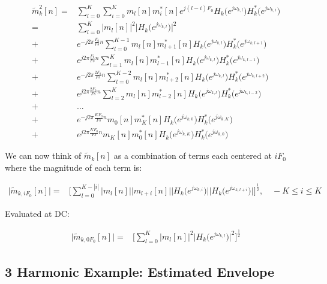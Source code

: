 \documentclass [11pt, proquest] {uwthesis}[2015/03/03]
\begin{document}
\begin{align}
\tilde{m}_k^2[n] =& \sum\limits_{l=0}^K \sum\limits_{i=0}^K m_l[n] m_i^*[n] e^{j(l-i)F_0} H_k\big(e^{j\omega_{k,l}}\big)H_k^*\big(e^{j\omega_{k,i}}\big) \\
%
%
%
=& \sum\limits_{l=0}^K \Big|m_l[n]\Big|^2 \Big|H_k\big(e^{j\omega_{k,l}}\big)\Big|^2 \nonumber \\
%
%
+& e^{-j2\pi \frac{F_0}{Fs}n} \sum\limits_{l=0}^{K-1} m_l[n] m_{l+1}^*[n] H_k\big(e^{j\omega_{k,l}}\big)H_k^*\big(e^{j\omega_{k,l+1}}\big) \nonumber \\
%
+&  e^{j2\pi \frac{F_0}{Fs}n} \sum\limits_{l=1}^{K} m_l[n] m_{l-1}^*[n] H_k\big(e^{j\omega_{k,l}}\big)H_k^*\big(e^{j\omega_{k,l-1}}\big) \nonumber \\
%
%
+& e^{-j2\pi \frac{2F_0}{Fs}n} \sum\limits_{l=0}^{K-2} m_l[n] m_{l+2}^*[n] H_k\big(e^{j\omega_{k,l}}\big)H_k^*\big(e^{j\omega_{k,l+2}}\big) \nonumber \\
%
+& e^{j2\pi \frac{2F_0}{Fs}n}  \sum\limits_{l=2}^{K} m_l[n] m_{l-2}^*[n] H_k\big(e^{j\omega_{k,l}}\big)H_k^*\big(e^{j\omega_{k,l-2}}\big) \nonumber \\
%
%
+& ... \nonumber \\
%
%
+& e^{-j2\pi \frac{KF_0}{Fs}n} m_0[n] m_K^*[n] H_k\big(e^{j\omega_{k,0}}\big)H_k^*\big(e^{j\omega_{k,K}}\big) \nonumber \\
%
+& e^{j2\pi \frac{KF_0}{Fs}n}  m_K[n] m_0^*[n] H_k\big(e^{j\omega_{k,K}}\big)H_k^*\big(e^{j\omega_{k,0}}\big)
\end{align}

We can now think of $\tilde{m}_k[n]$ as a combination of terms each centered at $iF_0$ where the magnitude of each term is:

\begin{align}
\Big| \tilde{m}_{k,iF_0}[n] \Big| =& \Bigg[ \sum\limits_{l=0}^{K-|i|} \Big| m_l[n]\Big| \Big|m_{l+i}[n]\Big| \Big|H_k\big(e^{j\omega_{k,i}}\big)\Big| \Big|H_k\big(e^{j\omega_{k,l+i}}\big)\Big|\Bigg]^\frac{1}{2}, \quad -K \leq i \leq K
\end{align}

Evaluated at DC:

\begin{align}
\Big| \tilde{m}_{k,0F_0}[n] \Big| =& \Bigg[  \sum\limits_{l=0}^K \Big|m_l[n]\Big|^2 \Big|H_k\big(e^{j\omega_{k,l}}\big)\Big|^2 \Bigg]^\frac{1}{2}
\end{align}

\subsection{3 Harmonic Example: Estimated Envelope}
\end{document}
